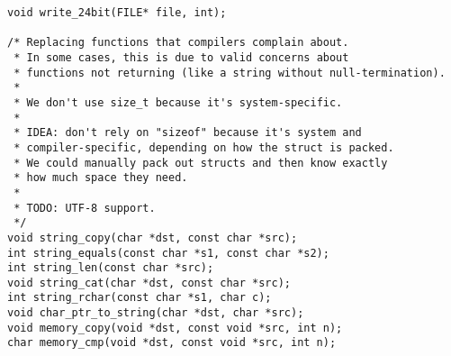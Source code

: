 \begin{lstlisting}
void write_24bit(FILE* file, int);

/* Replacing functions that compilers complain about.
 * In some cases, this is due to valid concerns about
 * functions not returning (like a string without null-termination).
 *
 * We don't use size_t because it's system-specific.
 *
 * IDEA: don't rely on "sizeof" because it's system and
 * compiler-specific, depending on how the struct is packed.
 * We could manually pack out structs and then know exactly
 * how much space they need.
 *
 * TODO: UTF-8 support.
 */
void string_copy(char *dst, const char *src);
int string_equals(const char *s1, const char *s2);
int string_len(const char *src);
void string_cat(char *dst, const char *src);
int string_rchar(const char *s1, char c);
void char_ptr_to_string(char *dst, char *src);
void memory_copy(void *dst, const void *src, int n);
char memory_cmp(void *dst, const void *src, int n);


\end{lstlisting}
